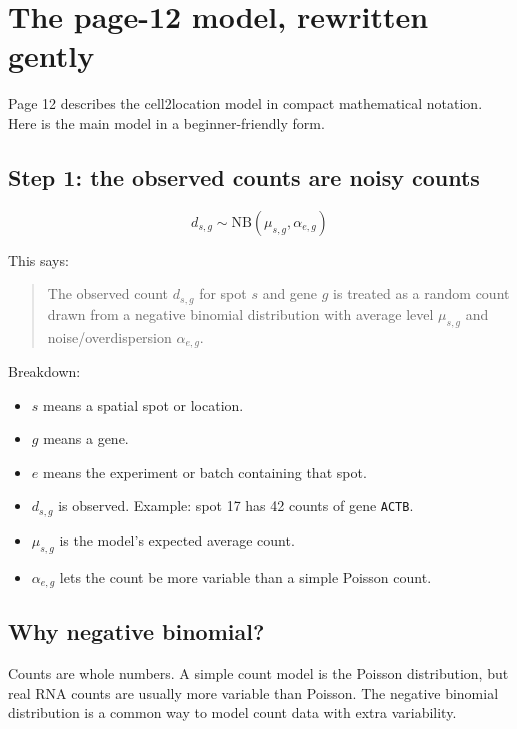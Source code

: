 \documentclass[11pt]{article}
\newcommand{\NB}{\mathrm{NB}}
\newcommand{\code}[1]{\texttt{#1}}
\begin{document}
\section{The page-12 model, rewritten gently}

Page 12 describes the cell2location model in compact mathematical notation. Here is the main model in a beginner-friendly form.

\subsection{Step 1: the observed counts are noisy counts}

\begin{mathbox}
\[
\boxed{d_{s,g} \sim \NB(\mu_{s,g},\alpha_{e,g})}
\]
\end{mathbox}

This says:

\begin{quote}
The observed count $d_{s,g}$ for spot $s$ and gene $g$ is treated as a random count drawn from a negative binomial distribution with average level $\mu_{s,g}$ and noise/overdispersion $\alpha_{e,g}$.
\end{quote}

Breakdown:

\begin{itemize}
  \item $s$ means a spatial spot or location.
  \item $g$ means a gene.
  \item $e$ means the experiment or batch containing that spot.
  \item $d_{s,g}$ is observed. Example: spot 17 has 42 counts of gene \code{ACTB}.
  \item $\mu_{s,g}$ is the model's expected average count.
  \item $\alpha_{e,g}$ lets the count be more variable than a simple Poisson count.
\end{itemize}

\subsection{Why negative binomial?}

Counts are whole numbers. A simple count model is the Poisson distribution, but real RNA counts are usually more variable than Poisson. The negative binomial distribution is a common way to model count data with extra variability.
\end{document}
